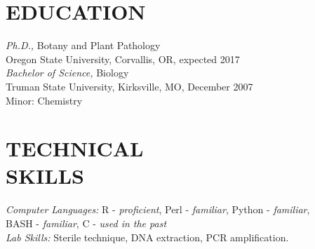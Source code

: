 \documentclass[margin, 10pt]{res} %
\begin{document}
\begin{resume}

 



\section{EDUCATION}

{\sl Ph.D.,} Botany and Plant Pathology \\
Oregon State University, Corvallis, OR, expected 2017 \\\newline
{\sl Bachelor of Science,} Biology \\
Truman State University, Kirksville, MO, December 2007 \\
Minor: Chemistry
 

\section{TECHNICAL \\ SKILLS} 

{\sl Computer Languages:} 
R - \textsl{proficient}, Perl - \textsl{familiar}, Python - \textsl{familiar}, \\BASH - \textsl{familiar}, C - \textsl{used in the past}\\\newline
{\sl Lab Skills:} Sterile technique, DNA extraction, PCR amplification. 
 

\end{resume}
\end{document}
